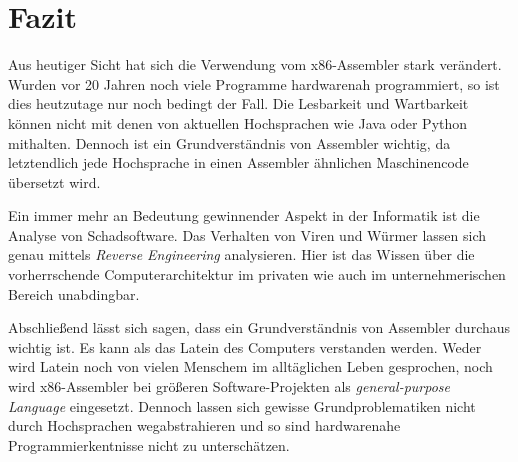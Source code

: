 \section{Fazit}
Aus heutiger Sicht hat sich die Verwendung vom x86-Assembler stark verändert.
Wurden vor 20 Jahren noch viele Programme hardwarenah programmiert, so ist dies heutzutage nur noch bedingt der Fall.
Die Lesbarkeit und Wartbarkeit können nicht mit denen von aktuellen Hochsprachen wie Java oder Python mithalten.
Dennoch ist ein Grundverständnis von Assembler wichtig, da letztendlich jede Hochsprache in einen Assembler ähnlichen Maschinencode übersetzt wird.

Ein immer mehr an Bedeutung gewinnender Aspekt in der Informatik ist die Analyse von Schadsoftware.
Das Verhalten von Viren und Würmer lassen sich genau mittels \textit{Reverse Engineering} analysieren.
Hier ist das Wissen über die vorherrschende Computerarchitektur im privaten wie auch im unternehmerischen Bereich unabdingbar.

Abschließend lässt sich sagen, dass ein Grundverständnis von Assembler durchaus wichtig ist.
Es kann als das Latein des Computers verstanden werden.
Weder wird Latein noch von vielen Menschem im alltäglichen Leben gesprochen, noch wird x86-Assembler bei größeren Software-Projekten als \textit{general-purpose Language} eingesetzt.
Dennoch lassen sich gewisse Grundproblematiken nicht durch Hochsprachen wegabstrahieren und so sind hardwarenahe Programmierkentnisse nicht zu unterschätzen.
